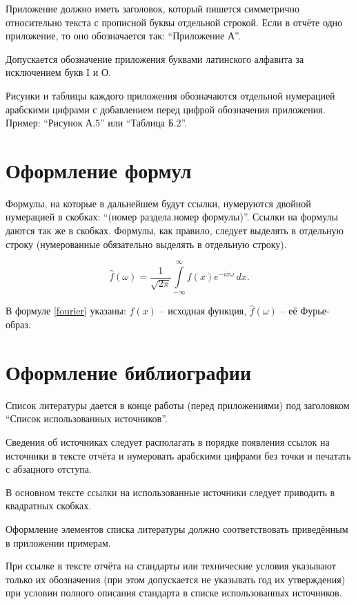 \documentclass[utf8,14pt, coursreport]{G7-32}
\begin{document}
Приложение должно иметь заголовок, который пишется симметрично относительно текста с прописной буквы отдельной строкой. Если в отчёте одно приложение, то оно обозначается так: ``Приложение А''.

Допускается обозначение приложения буквами латинского алфавита за исключением букв I и О.

Рисунки и таблицы каждого приложения обозначаются отдельной нумерацией арабскими цифрами с добавлением перед цифрой обозначения приложения. Пример: ``Рисунок А.5'' или ``Таблица Б.2''.

\section{Оформление формул}

Формулы, на которые в дальнейшем будут ссылки, нумеруются двойной нумерацией в скобках: ``(номер раздела.номер формулы)''. Ссылки на формулы даются так же в скобках. Формулы, как правило, следует выделять в отдельную строку (нумерованные обязательно выделять в отдельную строку).

\begin{equation}\label{fourier}
\hat{f}(\omega)=\frac{1}{\sqrt{2\pi}}\int\limits_{-\infty}^{\infty}f(x)e^{-ix\omega}\,dx.
\end{equation}

В формуле \eqref{fourier} указаны: $f(x)$ -- исходная функция, $\hat{f}(\omega)$ -- её Фурье-образ.

\section{Оформление библиографии}

Список литературы дается в конце работы (перед приложениями) под заголовком ``Список использованных источников''.

Сведения об источниках следует располагать в порядке появления ссылок на источники в тексте отчёта и нумеровать арабскими цифрами без точки и печатать с абзацного отступа.

В основном тексте ссылки на использованные источники следует приводить в квадратных скобках.

Оформление элементов списка литературы должно соответствовать приведённым в приложении примерам.

При ссылке в тексте отчёта на стандарты или технические условия указывают только их обозначения (при этом допускается не указывать год их утверждения) при условии полного описания стандарта в списке использованных источников.
\end{document}
